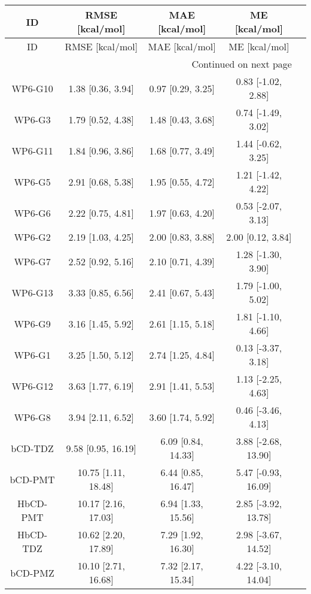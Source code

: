 \documentclass[8pt]{article}
\begin{document}
\begin{center}
\begin{footnotesize}
\begin{longtable}{|ccccc|}
\toprule
      ID &     RMSE [kcal/mol] &      MAE [kcal/mol] &       ME [kcal/mol] \\
\midrule
\endfirsthead

\toprule
      ID &     RMSE [kcal/mol] &      MAE [kcal/mol] &       ME [kcal/mol] \\
\midrule
\endhead
\midrule
\multicolumn{4}{r}{{Continued on next page}} \\
\midrule
\endfoot

\bottomrule
\endlastfoot
 WP6-G10 &   1.38 [0.36, 3.94] &   0.97 [0.29, 3.25] &  0.83 [-1.02, 2.88] \\
  WP6-G3 &   1.79 [0.52, 4.38] &   1.48 [0.43, 3.68] &  0.74 [-1.49, 3.02] \\
 WP6-G11 &   1.84 [0.96, 3.86] &   1.68 [0.77, 3.49] &  1.44 [-0.62, 3.25] \\
  WP6-G5 &   2.91 [0.68, 5.38] &   1.95 [0.55, 4.72] &  1.21 [-1.42, 4.22] \\
  WP6-G6 &   2.22 [0.75, 4.81] &   1.97 [0.63, 4.20] &  0.53 [-2.07, 3.13] \\
  WP6-G2 &   2.19 [1.03, 4.25] &   2.00 [0.83, 3.88] &   2.00 [0.12, 3.84] \\
  WP6-G7 &   2.52 [0.92, 5.16] &   2.10 [0.71, 4.39] &  1.28 [-1.30, 3.90] \\
 WP6-G13 &   3.33 [0.85, 6.56] &   2.41 [0.67, 5.43] &  1.79 [-1.00, 5.02] \\
  WP6-G9 &   3.16 [1.45, 5.92] &   2.61 [1.15, 5.18] &  1.81 [-1.10, 4.66] \\
  WP6-G1 &   3.25 [1.50, 5.12] &   2.74 [1.25, 4.84] &  0.13 [-3.37, 3.18] \\
 WP6-G12 &   3.63 [1.77, 6.19] &   2.91 [1.41, 5.53] &  1.13 [-2.25, 4.63] \\
  WP6-G8 &   3.94 [2.11, 6.52] &   3.60 [1.74, 5.92] &  0.46 [-3.46, 4.13] \\
 bCD-TDZ &  9.58 [0.95, 16.19] &  6.09 [0.84, 14.33] & 3.88 [-2.68, 13.90] \\
 bCD-PMT & 10.75 [1.11, 18.48] &  6.44 [0.85, 16.47] & 5.47 [-0.93, 16.09] \\
HbCD-PMT & 10.17 [2.16, 17.03] &  6.94 [1.33, 15.56] & 2.85 [-3.92, 13.78] \\
HbCD-TDZ & 10.62 [2.20, 17.89] &  7.29 [1.92, 16.30] & 2.98 [-3.67, 14.52] \\
 bCD-PMZ & 10.10 [2.71, 16.68] &  7.32 [2.17, 15.34] & 4.22 [-3.10, 14.04] \\

\end{longtable}
\end{footnotesize}
\end{center}
\end{document}
